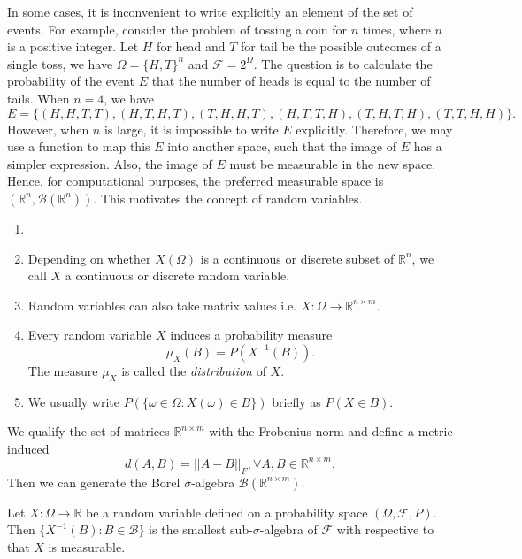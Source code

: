In some cases, it is inconvenient to write explicitly an element of the set of events. For example, consider the problem of tossing a coin for $n$ times, where $n$ is a positive integer. Let $H$ for head and $T$ for tail be the possible outcomes of a single toss, we have $\Omega=\{H,T\}^n$ and $\mathcal{F}=2^\Omega$. The question is to calculate the probability of the event $E$ that the number of heads is equal to the number of tails. When $n=4$, we have
$$E=\{(H,H,T,T),(H,T,H,T),(T,H,H,T),(H,T,T,H),(T,H,T,H),(T,T,H,H)\}.$$
However, when $n$ is large, it is impossible to write $E$ explicitly. Therefore, we may use a function to map this $E$ into another space, such that the image of $E$ has a simpler expression. Also, the image of $E$ must be measurable in the new space. Hence, for computational purposes, the preferred measurable space is $(\mathbb{R}^n,\mathcal{B}(\mathbb{R}^n))$. This motivates the concept of random variables.

\begin{remark}
    \begin{enumerate}
        \item []
        \item Depending on whether $X(\Omega)$ is a continuous or discrete subset of $\mathbb{R}^n$, we call $X$ a continuous or discrete random variable.
        \item Random variables can also take matrix values i.e. $X:\Omega\to\mathbb{R}^{n\times m}$.
        \item Every random variable $X$ induces a probability measure
              \begin{equation}
                  \mu_X(B) = P(X^{-1}(B)).
              \end{equation} The measure $\mu_X$ is called the \textit{distribution} of $X$.
        \item We usually write $P(\{\omega\in\Omega : X(\omega)\in B\})$ briefly as $P(X\in B)$.
    \end{enumerate}
\end{remark}

\begin{remark}
    We qualify the set of matrices $\mathbb{R}^{n\times m}$ with the Frobenius norm and define a metric induced
    $$d(A,B)=||A-B||_F,\forall A,B\in \mathbb{R}^{n\times m}.$$
    Then we can generate the Borel $\sigma$-algebra $\mathcal{B}(\mathbb{R}^{n\times m})$.
\end{remark}

\begin{theorem}
    Let $X:\Omega\to\mathbb{R}$ be a random variable defined on a probability space $(\Omega, \mathcal{F}, P)$. Then $\{X^{-1}(B) : B\in \mathcal{B}\}$ is the smallest sub-$\sigma$-algebra of $\mathcal{F}$ with respective to that $X$ is measurable.
\end{theorem}


